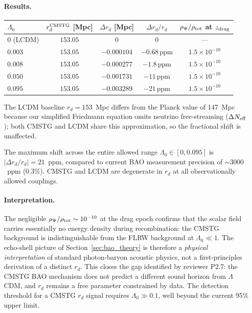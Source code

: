 \documentclass[12pt,a4paper]{article}
\begin{document}
\paragraph{Results.}
\begin{center}
\begin{tabular}{lcccc}
\toprule
$\Lambda_0$ & $r_d^{\rm CMSTG}$ [Mpc] & $\Delta r_d$ [Mpc] & $\Delta r_d/r_d$ & $\rho_\Psi/\rho_{\rm tot}$ at $z_{\rm drag}$ \\
\midrule
$0$ (LCDM)  & $153.05$ & $0$ & $0$ & --- \\
$0.003$     & $153.05$ & $-0.000104$ & $-0.68\,\mathrm{ppm}$ & $1.5\times10^{-10}$ \\
$0.008$     & $153.05$ & $-0.000277$ & $-1.8\,\mathrm{ppm}$  & $1.5\times10^{-10}$ \\
$0.050$     & $153.05$ & $-0.001731$ & $-11\,\mathrm{ppm}$   & $1.5\times10^{-10}$ \\
$0.095$     & $153.05$ & $-0.003289$ & $-21\,\mathrm{ppm}$   & $1.5\times10^{-10}$ \\
\bottomrule
\end{tabular}
\end{center}
The LCDM baseline $r_d = 153$~Mpc differs from the Planck value of 147~Mpc
because our simplified Friedmann equation omits neutrino free-streaming
($\Delta N_{\rm eff}$); both CMSTG and LCDM share this approximation,
so the fractional shift is unaffected.

The maximum shift across the entire allowed range $\Lambda_0 \in [0, 0.095]$
is $|\Delta r_d / r_d| = 21$~ppm, compared to current BAO measurement
precision of $\sim 3000$~ppm (0.3\%). CMSTG and LCDM are degenerate in
$r_d$ at all observationally allowed couplings.

\paragraph{Interpretation.}
The negligible $\rho_\Psi/\rho_{\rm tot} \sim 10^{-10}$ at the drag epoch
confirms that the scalar field carries essentially no energy density during
recombination: the CMSTG background is indistinguishable from the FLRW
background at $\Lambda_0 \ll 1$. The echo-shell picture of
Section~\ref{sec:bao_theory} is therefore a \emph{physical interpretation}
of standard photon-baryon acoustic physics, not a first-principles derivation
of a distinct $r_d$. This closes the gap identified by reviewer P2.7:
the CMSTG BAO mechanism does not predict a different sound horizon from
$\Lambda$CDM, and $r_d$ remains a free parameter constrained by data.
The detection threshold for a CMSTG $r_d$ signal requires $\Lambda_0 \gg 0.1$,
well beyond the current 95\% upper limit.
\end{document}
